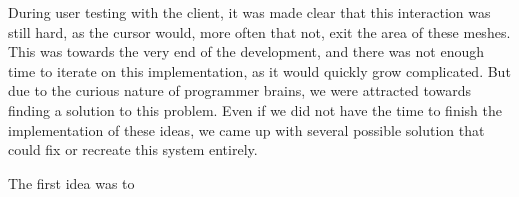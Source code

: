 During user testing with the client, it was made clear that this interaction was still hard, as the cursor would, more often that not, exit the area of these meshes. This was towards the very end of the development, and there was not enough time to iterate on this implementation, as it would quickly grow complicated. But due to the curious nature of programmer brains, we were attracted towards finding a solution to this problem. Even if we did not have the time to finish the implementation of these ideas, we came up with several possible solution that could fix or recreate this system entirely.

The first idea was to 